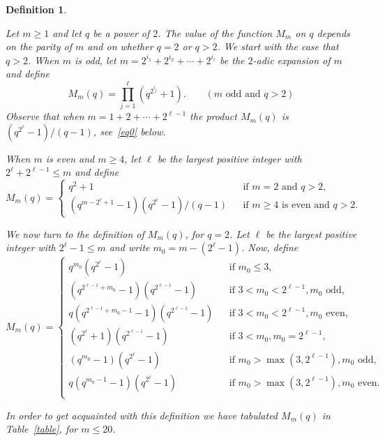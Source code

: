\documentclass{amsart}
\newtheorem{definition}[theorem]{Definition}
\begin{document}
\begin{definition}\label{def}{\rm Let $m\geq 1$ and let $q$ be a power of $2$. The value of the function $M_m$ on $q$ depends on the parity of $m$ and on whether $q=2$ or $q>2$.  We start with the case that $q>2$. When $m$ is odd, let  $m=2^{i_1}+2^{i_2}+\cdots +2^{i_\ell}$ be the $2$-adic expansion of $m$ and define $$M_{m}(q)=\prod_{j=1}^{\ell}(q^{2^{i_j}}+1).\qquad (m\textrm{ odd and }q>2)$$
Observe that when $m=1+2+\cdots +2^{\ell-1}$ the product $M_m(q)$ is $(q^{2^\ell}-1)/(q-1)$, see~\eqref{eq0} below.

When $m$ is even and $m\geq 4$, let $\ell$ be the largest positive integer with $2^\ell+2^{\ell-1}\leq m$ and define
\[
M_{m}(q)=
\left\{
\begin{array}{lcl}
q^2+1&&\textrm{if }m=2 \textrm{ and }q>2,\\ 
(q^{m-2^\ell+1}-1)(q^{2^{\ell}}-1)/(q-1)&&\textrm{if }m\geq 4\textrm{ is even and }q>2.
\end{array}
\right.
\]

We now turn to the definition of $M_{m}(q)$, for $q=2$. Let $\ell$ be the largest positive integer with $2^\ell-1\leq m$ and write $m_0=m-(2^\ell-1)$. Now, define
\begin{equation}\label{eqdef}
M_{m}(q)=\left\{
\begin{array}{lcl}
q^{m_0}(q^{2^\ell}-1)&&\textrm{if }m_0\leq 3,\\
(q^{2^{\ell-1}+m_0}-1)(q^{2^{\ell-1}}-1)&&\textrm{if }3<m_0<2^{\ell-1}, m_0 \textrm{ odd},\\
q(q^{2^{\ell-1}+m_0-1}-1)(q^{2^{\ell-1}}-1)&&\textrm{if }3<m_0<2^{\ell-1}, m_0 \textrm{ even},\\
(q^{2^{\ell}}+1)(q^{2^{\ell-1}}-1)&&\textrm{if }3<m_0, m_0=2^{\ell-1},\\
(q^{m_0}-1)(q^{2^{\ell}}-1)&&\textrm{if }m_0>\max(3,2^{\ell-1}), m_0 \textrm{ odd},\\
q(q^{m_0-1}-1)(q^{2^{\ell}}-1)&&\textrm{if }m_0>\max(3,2^{\ell-1}), m_0 \textrm{ even}.\\
\end{array}
\right.
\end{equation}

In order to get acquainted with this definition we have tabulated $M_{m}(q)$ in Table~\ref{table}, for $m\leq 20$.
}
\end{definition}
\end{document}
